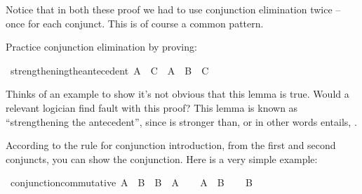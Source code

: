 \begin{isabellebody}
\isanewline
{}\isamarkupfalse%
%
\endisatagproof
{\isafoldproof}%
%
\isadelimproof
%
\endisadelimproof
%
\begin{isamarkuptext}%
Notice that in both these proof we had to use conjunction elimination twice -- once for each
conjunct. This is of course a common pattern.%
\end{isamarkuptext}\isamarkuptrue%
%
\begin{isamarkuptext}%
\begin{Exercise}[title = Strengthening the Antecedent] Practice conjunction elimination by proving: \end{Exercise}%
\end{isamarkuptext}\isamarkuptrue%
\isamarkupfalse%
\ strengthening{\isacharunderscore}the{\isacharunderscore}antecedent{\isacharcolon}\ {\isachardoublequoteopen}{\isacharparenleft}A\ {\isasymlongrightarrow}\ C{\isacharparenright}\ {\isasymlongrightarrow}\ {\isacharparenleft}A\ {\isasymand}\ B\ {\isasymlongrightarrow}\ C{\isacharparenright}{\isachardoublequoteclose}%
\isadelimproof
\ %
\endisadelimproof
%
\isatagproof
{}\isamarkupfalse%
%
\endisatagproof
{\isafoldproof}%
%
\isadelimproof
%
\endisadelimproof
%
\begin{isamarkuptext}%
Thinks of an example to show it's not obvious that this lemma is true. Would a relevant logician
find fault with this proof? This lemma is known as ``strengthening the antecedent'', since 
is stronger than, or in other words entails, .%
\end{isamarkuptext}\isamarkuptrue%
%
\isamarkuptrue%
%
\begin{isamarkuptext}%
According to the rule for conjunction introduction, from the first and second conjuncts, you
can show the conjunction. Here is a very simple example:%
\end{isamarkuptext}\isamarkuptrue%
\isamarkupfalse%
\ conjunction{\isacharunderscore}commutative{\isacharcolon}\ {\isachardoublequoteopen}A\ {\isasymand}\ B\ {\isasymlongrightarrow}\ B\ {\isasymand}\ A{\isachardoublequoteclose}\isanewline
%
\isadelimproof
%
\endisadelimproof
%
\isatagproof
{}\isamarkupfalse%
\isanewline
\ \ \isamarkupfalse%
\ {\isachardoublequoteopen}A\ {\isasymand}\ B{\isachardoublequoteclose}\isanewline
\ \ \isamarkupfalse%
\ {\isachardoublequoteopen}B{\isachardoublequoteclose}\isacommand{{\isachardot}{\isachardot}}\isamarkupfalse%

\end{isabellebody}
